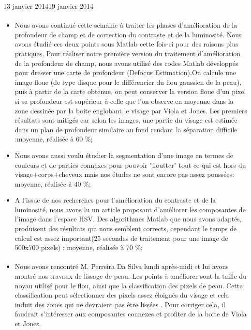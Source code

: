 \documentclass[11pt, french,screen]{report-rd-info}
\begin{document}
\begin{fichesuivi}{13 janvier 2014}{19 janvier 2014}
\paragraph{}
	\begin{travaileffectue}
		\begin{itemize}
			\item Nous avons continué cette semaine à traiter les phases d'amélioration de la profondeur de champ et de correction du contraste et de la luminosité. Nous avons étudié ces deux points sous Matlab cette fois-ci pour des raisons plus pratiques. Pour réaliser notre première version du traitement d'amélioration de la profondeur de champ, nous avons utilisé des codes Matlab développés pour dresser une carte de profondeur (Defocus Estimation).On calcule une image floue (de type disque pour le différencier du flou gaussien de la peau), puis à partir de la carte obtenue, on peut conserver la version floue d'un pixel si sa profondeur est supérieur à celle que l'on observe en moyenne dans la zone dessinée par la boite englobant le visage par Viola et Jones. Les premiers résultats sont mitigés car selon les images, une partie du visage est estimée dans un plan de profondeur similaire au fond rendant la séparation difficile :moyenne, réalisée à $60$ \%;
			\item Nous avons aussi voulu étudier la segmentation d'une image en termes de couleurs et de parties connexes pour pouvoir "floutter" tout ce qui est hors du visage+corps+cheveux mais nos études ne sont encore pas assez poussées: moyenne, réalisée à $40$ \%;
			\item A l'issue de nos recherches pour l'amélioration du contraste et de la luminosité, nous avons lu un article proposant d'améliorer les composantes de l'image dans l'espace HSV. Des algorithmes Matlab que nous avons adaptés, produisent des résultats qui nous semblent corrects, cependant le temps de calcul est assez important(25 secondes de traitement pour une image de 500x700 pixels) : moyenne, réalisée à $70$ \%;
		\end{itemize}
	\end{travaileffectue}

\paragraph{}
	\begin{echange}
		\begin{itemize}
			\item Nous avons rencontré M. Perreira Da Silva lundi après-midi et lui avons montré nos travaux de lissage de peau. Les points à améliorer sont la taille du noyau utilisé pour le flou, ainsi que la classification des pixels de peau. Cette classification peut sélectionner des pixels assez éloignés du visage et cela induit des zones qui ne devraient pas être lissées . Pour corriger cela, il faudrait s'intéresser aux composantes connexes et profiter de la boite de Viola et Jones.
		\end{itemize}
	\end{echange}



\end{fichesuivi}
\end{document}
